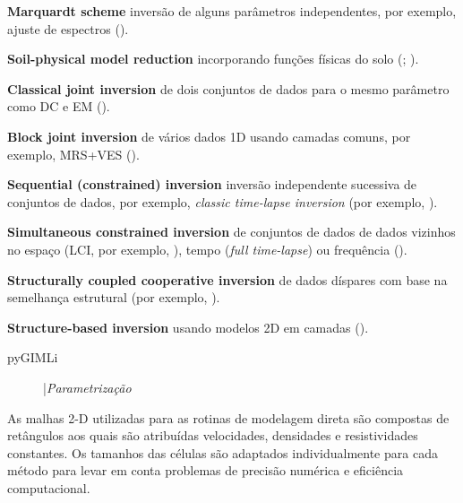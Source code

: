 \documentclass[a4paper, 12 pt]{article} %
\begin{document}
\begin{itemize}
	\hspace{0.5cm} \textbf{Marquardt scheme} inversão de alguns parâmetros independentes, por exemplo, ajuste de espectros (\citealp{loewer2015spectral}).
	
	\hspace{0.5cm} \textbf{Soil-physical model reduction} incorporando funções físicas do solo (\citealp{igel2016high}; \citealp{costabel2014noninvasive}).
	
	\hspace{0.5cm} \textbf{Classical joint inversion} de dois conjuntos de dados para o mesmo parâmetro como DC e EM (\citealp{gunther2013inversion}).
	
	\hspace{0.5cm} \textbf{Block joint inversion} de vários dados 1D usando camadas comuns, por exemplo, MRS+VES (\citealp{gunther2012hydraulic}).
	
	\hspace{0.5cm} \textbf{Sequential (constrained) inversion} inversão independente sucessiva de conjuntos de dados, por exemplo, \textit{classic time-lapse inversion} (por exemplo, \citealp{hubner2015monitoring}).
	
	\hspace{0.5cm} \textbf{Simultaneous constrained inversion} de conjuntos de dados de dados vizinhos no espaço (LCI, por exemplo, \citealp{costabel2016torus}), tempo (\textit{full time-lapse}) ou frequência (\citealp{gunther2016spectral}).
	
	\hspace{0.5cm} \textbf{Structurally coupled cooperative inversion} de dados díspares com base na semelhança estrutural (por exemplo, \citealp{ronczka2017electric}).
	
	\hspace{0.5cm} \textbf{Structure-based inversion} usando modelos 2D em camadas (\citealp{attwa2014structure}).
\end{itemize}

\begin{description}
	\item[pyGIMLi] |\textit{Parametrização} 
\end{description}

As malhas 2-D utilizadas para as rotinas de modelagem direta são compostas de retângulos aos quais são atribuídas velocidades, densidades e resistividades constantes. Os tamanhos das células são adaptados individualmente para cada método para levar em conta problemas de precisão numérica e eficiência computacional.
\end{document}
